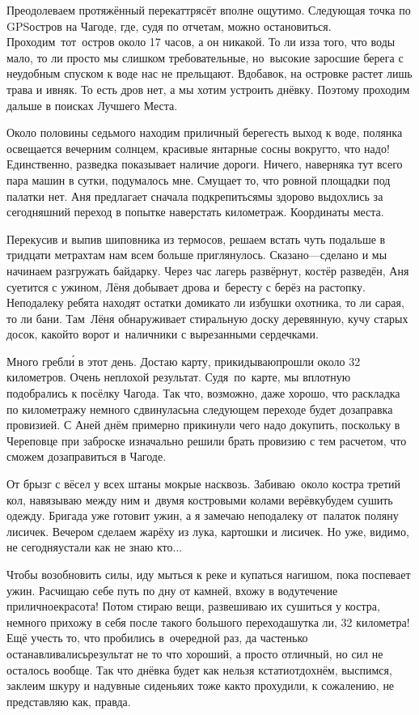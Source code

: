 Преодолеваем протяжённый перекат\mdash трясёт вполне ощутимо. Следующая точка по GPS\mdash остров на Чагоде, где, судя по отчетам, можно остановиться. Проходим~тот~остров около 17 часов, а он никакой. То ли из\sdash за того, что воды мало, то ли просто мы слишком требовательные, но~высокие заросшие берега с неудобным спуском к воде нас не прельщают. Вдобавок, на островке растет лишь трава и ивняк. То есть дров нет, а мы хотим устроить днёвку. Поэтому проходим дальше в поисках Лучшего Места.

 Около половины седьмого находим приличный берег\mdash есть выход к воде, полянка освещается вечерним солнцем, красивые янтарные сосны вокруг\mdash то, что надо! Единственно, разведка показывает наличие дороги. Ничего, наверняка тут всего пара машин в сутки, подумалось мне. Смущает то, что ровной площадки под палатки нет. Аня предлагает сначала подкрепиться\mdash мы здорово выдохлись за сегодняшний переход в попытке наверстать километраж. Координаты места\mdash \CoordsChagodaFifteenFirstDnevka.

Перекусив и выпив шиповника из термосов, решаем встать чуть подальше в тридцати метрах\mdash там нам всем больше приглянулось. Сказано\thinspace---\thinspace сделано и мы начинаем разгружать байдарку. Через час лагерь развёрнут, костёр разведён, Аня суетится с ужином, Лёня добывает дрова и~бересту с берёз на растопку.
\newpage 
Неподалеку ребята находят остатки домика\mdash то ли избушки охотника, то ли сарая, то ли бани. Там~Лёня обнаруживает стиральную доску деревянную, кучу старых досок, какой\sdash то ворот и~наличники с вырезанными сердечками. 

Много гребл\'{и} в этот день. Достаю карту, прикидываю\mdash прошли около 32 километров. Очень неплохой результат. Судя~по~карте, мы вплотную подобрались к посёлку Чагода. Так что, возможно, даже хорошо, что раскладка по километражу немного сдвинулась\mdash на следующем переходе будет дозаправка провизией. С Аней днём примерно прикинули чего надо докупить, поскольку в Череповце при заброске изначально решили брать провизию с тем расчетом, что сможем дозаправиться в Чагоде.

От брызг с вёсел у всех штаны мокрые насквозь. Забиваю~около костра третий кол, навязываю между ним и~двумя костровыми колами верёвку\mdash будем сушить одежду. Бригада уже готовит ужин, а я замечаю неподалеку от~палаток поляну лисичек. Вечером сделаем жарёху из лука, картошки и лисичек. Но уже, видимо, не сегодня\mdash устали как не знаю кто$\ldots$ 

Чтобы возобновить силы, иду мыться к реке и купаться нагишом, пока поспевает ужин. Расчищаю себе путь по дну от камней, вхожу в воду\mdash течение приличное\mdash красота! Потом стираю вещи, развешиваю их сушиться у костра, немного прихожу в себя после такого большого перехода\mdash шутка ли, 32 километра! Ещё учесть то, что пробились в~очередной раз, да частенько останавливались\mdash результат не то что хороший, а просто отличный, но сил не осталось вообще. Так что днёвка будет как нельзя кстати\mdash отдохнём, выспимся, заклеим шкуру и надувные сиденья\mdash их тоже как\sdash то прохудили, к сожалению, не представляю как, правда.

